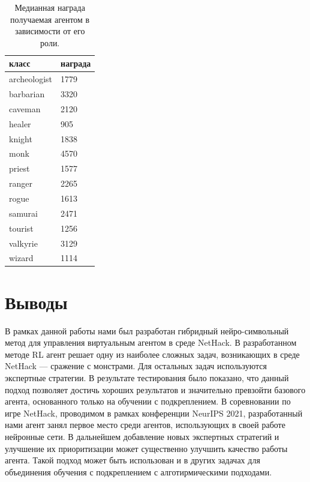 \begin{table} [htbp]
    \centering
    \begin{threeparttable}
        \caption{Медианная награда получаемая агентом в зависимости от его роли.}\label{tab:raph_analize}
        \begin{tabular}{| p{8cm} || p{8cm} |}
            \hline
            \hline
            класс & награда \\
            \hline
            archeologist & 1779 \\
            barbarian & 3320 \\
            caveman & 2120 \\
            healer & 905 \\
            knight & 1838 \\
            monk & 4570 \\
            priest & 1577 \\
            ranger & 2265 \\
            rogue & 1613 \\
            samurai & 2471 \\
            tourist & 1256 \\
            valkyrie & 3129 \\
            wizard & 1114 \\
            \hline
            \hline
        \end{tabular}
    \end{threeparttable}
\end{table}

\section{Выводы}

В рамках данной работы нами был разработан гибридный нейро-символьный метод для управления виртуальным агентом в среде NetHack. В разработанном методе RL агент решает одну из наиболее сложных задач, возникающих в среде NetHack --- сражение с монстрами. Для остальных задач используются экспертные стратегии. В результате тестирования было показано, что данный подход позволяет достичь хороших результатов и значительно превзойти базового агента, основанного только на обучении с подкреплением. В соревновании по игре NetHack, проводимом в рамках конференции NeurIPS 2021, разработанный нами агент занял первое место среди агентов, использующих в своей работе нейронные сети. В дальнейшем добавление новых экспертных стратегий и улучшение их приоритизации может существенно улучшить качество работы агента. Такой подход может быть использован и в других задачах для объединения обучения с подкреплением с алготирмическими подходами.


\clearpage
